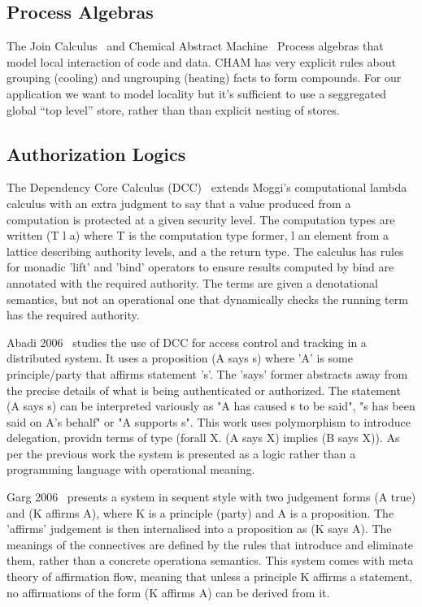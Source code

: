 \subsection{Process Algebras}
The Join Calculus~\cite{Cedric1996:Reflexive} and Chemical Abstract Machine~\cite{Berry1992:Chemical} Process algebras that model local interaction of code and data. CHAM has very explicit rules about grouping (cooling) and ungrouping (heating) facts to form compounds. For our application we want to model locality but it's sufficient to use a seggregated global ``top level'' store, rather than than explicit nesting of stores.


\subsection{Authorization Logics}
The Dependency Core Calculus (DCC)~\cite{Abadi1999:DCC} extends Moggi's computational lambda calculus with an extra judgment to say that a value produced from a computation is protected at a given security level. The computation types are written (T l a) where T is the computation type former, l an element from a lattice describing authority levels, and a the return type. The calculus has rules for monadic 'lift' and 'bind' operators to ensure results computed by bind are annotated with the required authority. The terms are given a denotational semantics, but not an operational one that dynamically checks the running term has the required authority.

Abadi 2006~\cite{Abadi2007:AccessControl} studies the use of DCC for access control and tracking in a distributed system. It uses a proposition (A says s) where 'A' is some principle/party that affirms statement 's'. The 'says' former abstracts away from the precise details of what is being authenticated or authorized. The statement (A says s) can be interpreted variously as "A has caused s to be said", "s has been said on A's behalf" or "A supports s". This work uses polymorphism to introduce delegation, providn terms of type (forall X. (A says X) implies (B says X)). As per the previous work \cite{Abadi1999:DCC} the system is presented as a logic rather than a programming language with operational meaning.

Garg 2006~\cite{Garg2006:Constructive} presents a system in sequent style with two judgement forms (A true) and (K affirms A), where K is a principle (party) and A is a proposition. The 'affirms' judgement is then internalised into a proposition as (K says A). The meanings of the connectives are defined by the rules that introduce and eliminate them, rather than a concrete operationa semantics. This system comes with meta theory of affirmation flow, meaning that unless a principle K affirms a statement, no affirmations of the form (K affirms A) can be derived from it.

